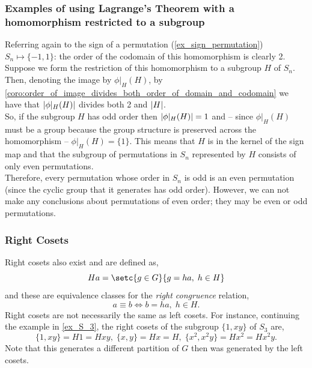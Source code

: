 \documentclass[MathsNotesBase.tex]{subfiles}
\begin{document}
{		\subsubsection{Examples of using Lagrange's Theorem with a homomorphism restricted to a subgroup}
		\begin{exe}
			\item{Referring again to the sign of a permutation (\ref{ex_sign_permutation}) ${ S_n \longmapsto \{-1,1\} }$: the order of the codomain of this homomorphism is clearly 2. Suppose we form the restriction of this homomorphism to a subgroup $H$ of $S_n$. Then, denoting the image by $\phi\vert_H(H)$, by \autoref{coro:order_of_image_divides_both_order_of_domain_and_codomain} we have that ${ \left\lvert\phi\vert_H(H)\right\rvert }$ divides both 2 and ${ \left\lvert H\right\rvert }$.\\
			So, if the subgroup $H$ has odd order then ${ \left\lvert\phi\vert_H(H)\right\rvert = 1 }$ and -- since $\phi\vert_H(H)$ must be a group because the group structure is preserved across the homomorphism --  ${ \phi\vert_H(H) = \{1\} }$. This means that $H$ is in the kernel of the sign map and that the subgroup of permutations in $S_n$ represented by $H$ consists of only even permutations.\\
			Therefore, every permutation whose order in $S_n$ is odd is an even permutation (since the cyclic group that it generates has odd order). However, we can not make any conclusions about permutations of even order; they may be even or odd permutations.
			}
		\end{exe}
	
		\bigskip
		\subsubsection{Right Cosets}
		Right cosets also exist and are defined as,
		 \[ Ha = \setc{g \in G}{g = ha, \; h \in H} \]
		and these are equivalence classes for the \textit{right congruence} relation,
		\[ a \equiv b \iff b = ha, \; h \in H. \]
		Right cosets are not necessarily the same as left cosets. For instance, continuing the example in \ref{ex_S_3}, the right cosets of the subgroup $\{1, xy\}$ of $S_3$ are,
		\[ \{1, xy\} = H1 = Hxy, \; \{x, y\} = Hx = H, \; \{x^2, x^2y\} = Hx^2 = Hx^2y. \]
		Note that this generates a different partition of $G$ then was generated by the left cosets.
	}
\end{document}

